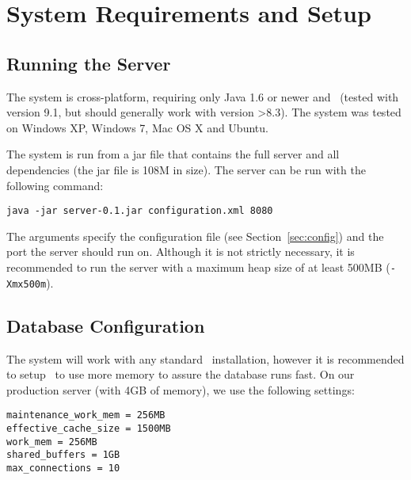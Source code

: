 \label{chap:technical_manual}

\section{System Requirements and Setup}

\subsection{Running the Server}

The system is cross-platform, requiring only Java 1.6 or newer and \postgres~(tested with version 9.1, but should generally work with version >8.3). The system was tested on Windows XP, Windows 7, Mac OS X and Ubuntu.

The system is run from a jar file that contains the full server and all dependencies (the jar file is 108M in size). The server can be run with the following command:

\vspace*{0.5em}
\begin{lstlisting}
java -jar server-0.1.jar configuration.xml 8080
\end{lstlisting}
\vspace*{0.5em}

The arguments specify the configuration file (see Section~\ref{sec:config}) and the port the server should run on. Although it is not strictly necessary, it is recommended to run the server with a maximum heap size of at least 500MB ({\tt -Xmx500m}).


\subsection{Database Configuration}
\label{sec:dbconfig}

The system will work with any standard \postgres~installation, however it is recommended to setup \postgres~to use more memory to assure the database runs fast. On our production server (with 4GB of memory), we use the following settings:


\vspace*{0.5em}
\begin{lstlisting}
maintenance_work_mem = 256MB
effective_cache_size = 1500MB
work_mem = 256MB
shared_buffers = 1GB
max_connections = 10
\end{lstlisting}
\vspace*{0.5em}

